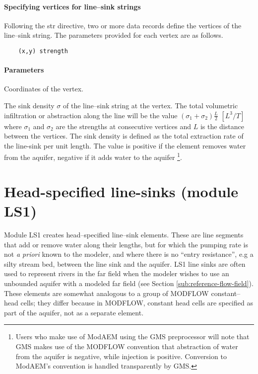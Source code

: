 \paragraph{Specifying vertices for line--sink strings}
Following the \textsf{str} directive, two or more data records define
the vertices of the line--sink string. The parameters provided for
each vertex are as follows.
\begin{verbatim}
    (x,y) strength
\end{verbatim}
\begin{description}
\paragraph{Parameters}
\item [\parameter{(x,y)}{complex}] Coordinates of the vertex. 
\item [\parameter{strength}{real}] The sink density $\sigma$ of the line--sink
string at the vertex. The total volumetric infiltration or abstraction
along the line will be the value $(\sigma_{1}+\sigma_{2})\frac{L}{2}$
$[L^{3}/T]$ where $\sigma_{1}$ and $\sigma_{2}$ are the strengths
at consecutive vertices and $L$ is the distance between the vertices.
The sink density is defined as the total extraction rate of the line-sink
per unit length. The value is positive if the element removes water
from the aquifer, negative if it adds water to the aquifer
\footnote{Users who make use of ModAEM using the GMS preprocessor will note
that GMS makes use of the MODFLOW convention that abstraction of water
from the aquifer is negative, while injection is positive. Conversion
to ModAEM's convention is handled transparently by GMS.
}. 
\end{description}
\newpage


\section{Head-specified line-sinks (module \textsf{LS1})\label{sec:ls1-module}}

Module LS1 creates head--specified line--sink elements. These are line segments
that add or remove water along their lengths, but for which the pumping
rate is not \emph{a priori} known to the modeler, and where there
is no ``entry resistance'', e.g a silty stream bed, between the
line sink and the aquifer. LS1 line sinks are often used
to represent rivers in the far field when the modeler wishes to use
an unbounded aquifer with a modeled far field (see Section \ref{sub:reference-flow-field}).
These elements are somewhat analogous to a group of MODFLOW constant--head
cells; they differ because in MODFLOW, constant head cells are specified
as part of the aquifer, not as a separate element.

